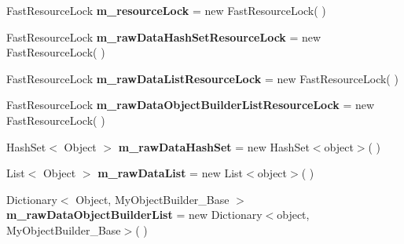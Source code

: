\begin{DoxyCompactItemize}
\item 
\hypertarget{class_s_e_mod_a_p_i_internal_1_1_a_p_i_1_1_entity_1_1_base_object_manager_a847caaf1474b9cadb378ab008d1eba58}{}Fast\+Resource\+Lock {\bfseries m\+\_\+resource\+Lock} = new Fast\+Resource\+Lock( )\label{class_s_e_mod_a_p_i_internal_1_1_a_p_i_1_1_entity_1_1_base_object_manager_a847caaf1474b9cadb378ab008d1eba58}

\item 
\hypertarget{class_s_e_mod_a_p_i_internal_1_1_a_p_i_1_1_entity_1_1_base_object_manager_ac75a6a3a79ae2fb6d8823a1e9d9c723e}{}Fast\+Resource\+Lock {\bfseries m\+\_\+raw\+Data\+Hash\+Set\+Resource\+Lock} = new Fast\+Resource\+Lock( )\label{class_s_e_mod_a_p_i_internal_1_1_a_p_i_1_1_entity_1_1_base_object_manager_ac75a6a3a79ae2fb6d8823a1e9d9c723e}

\item 
\hypertarget{class_s_e_mod_a_p_i_internal_1_1_a_p_i_1_1_entity_1_1_base_object_manager_a057db68951b560d6da5687a5fc9796dd}{}Fast\+Resource\+Lock {\bfseries m\+\_\+raw\+Data\+List\+Resource\+Lock} = new Fast\+Resource\+Lock( )\label{class_s_e_mod_a_p_i_internal_1_1_a_p_i_1_1_entity_1_1_base_object_manager_a057db68951b560d6da5687a5fc9796dd}

\item 
\hypertarget{class_s_e_mod_a_p_i_internal_1_1_a_p_i_1_1_entity_1_1_base_object_manager_abe10a38af33dbd7e59d1af467240c6fa}{}Fast\+Resource\+Lock {\bfseries m\+\_\+raw\+Data\+Object\+Builder\+List\+Resource\+Lock} = new Fast\+Resource\+Lock( )\label{class_s_e_mod_a_p_i_internal_1_1_a_p_i_1_1_entity_1_1_base_object_manager_abe10a38af33dbd7e59d1af467240c6fa}

\item 
\hypertarget{class_s_e_mod_a_p_i_internal_1_1_a_p_i_1_1_entity_1_1_base_object_manager_a12e7057582e2491180ce601832dbc84d}{}Hash\+Set$<$ Object $>$ {\bfseries m\+\_\+raw\+Data\+Hash\+Set} = new Hash\+Set$<$object$>$( )\label{class_s_e_mod_a_p_i_internal_1_1_a_p_i_1_1_entity_1_1_base_object_manager_a12e7057582e2491180ce601832dbc84d}

\item 
\hypertarget{class_s_e_mod_a_p_i_internal_1_1_a_p_i_1_1_entity_1_1_base_object_manager_a117ebf2cd5703c89005ef3b31664515f}{}List$<$ Object $>$ {\bfseries m\+\_\+raw\+Data\+List} = new List$<$object$>$( )\label{class_s_e_mod_a_p_i_internal_1_1_a_p_i_1_1_entity_1_1_base_object_manager_a117ebf2cd5703c89005ef3b31664515f}

\item 
\hypertarget{class_s_e_mod_a_p_i_internal_1_1_a_p_i_1_1_entity_1_1_base_object_manager_a067ebfef5dd5d2714391f3633717ac31}{}Dictionary$<$ Object, My\+Object\+Builder\+\_\+\+Base $>$ {\bfseries m\+\_\+raw\+Data\+Object\+Builder\+List} = new Dictionary$<$object, My\+Object\+Builder\+\_\+\+Base$>$( )\label{class_s_e_mod_a_p_i_internal_1_1_a_p_i_1_1_entity_1_1_base_object_manager_a067ebfef5dd5d2714391f3633717ac31}

\end{DoxyCompactItemize}
